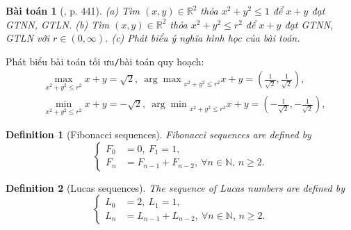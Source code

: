 \documentclass{article}
\newtheorem{baitoan}{Bài toán}
\newtheorem{definition}{Definition}
\begin{document}
\begin{baitoan}[\cite{Thu_Phuong_Tien_Triet_Phuong_KTLT}, p. 441]
	(a) Tìm $(x,y)\in\mathbb{R}^2$ thỏa $x^2 + y^2\le1$ để $x + y$ đạt {\rm GTNN, GTLN}. (b) Tìm $(x,y)\in\mathbb{R}^2$ thỏa $x^2 + y^2\le r^2$ để $x + y$ đạt {\rm GTNN, GTLN} với $r\in(0,\infty)$. (c) Phát biểu ý nghĩa hình học của bài toán.
\end{baitoan}
Phát biểu bài toán tối ưu{\tt/}bài toán quy hoạch:
\begin{align*}
	&\max_{x^2 + y^2\le r^2} x + y = \sqrt{2},\ {\arg\max}_{x^2 + y^2\le r^2} x + y = \left(\frac{1}{\sqrt{2}},\frac{1}{\sqrt{2}}\right),\\
	&\min_{x^2 + y^2\le r^2} x + y = -\sqrt{2},\ {\arg\min}_{x^2 + y^2\le r^2} x + y = \left(-\frac{1}{\sqrt{2}},-\frac{1}{\sqrt{2}}\right),
\end{align*}

\begin{definition}[Fibonacci sequences]
	{\sf Fibonacci sequences} are defined by
	\begin{equation*}
		\left\{\begin{split}
			F_0 &= 0,\ F_1 = 1,\\
			F_n &= F_{n - 1} + F_{n - 2},\ \forall n\in\mathbb{N},\,n\ge2.
		\end{split}\right.
	\end{equation*}
\end{definition}

\begin{definition}[Lucas sequences]
	The sequence of {\sf Lucas numbers} are defined by
	\begin{equation*}
		\left\{\begin{split}
			L_0 &= 2,\ L_1 = 1,\\
			L_n &= L_{n - 1} + L_{n - 2},\ \forall n\in\mathbb{N},\,n\ge2.
		\end{split}\right.
	\end{equation*}
\end{definition}
\end{document}
